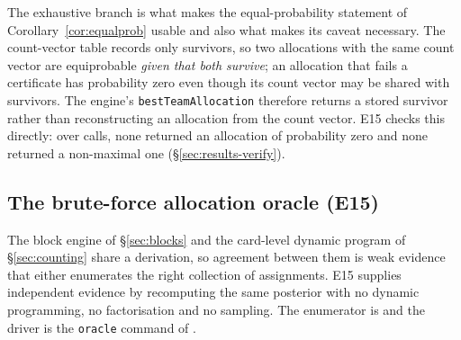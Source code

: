 The exhaustive branch is what makes the equal-probability statement of
Corollary~\ref{cor:equalprob} usable and also what makes its caveat necessary.
The count-vector table records only survivors, so two allocations with the same
count vector are equiprobable \emph{given that both survive}; an allocation that
fails a certificate has probability zero even though its count vector may be
shared with survivors. The engine's \texttt{bestTeamAllocation} therefore returns
a stored survivor rather than reconstructing an allocation from the count vector.
E15 checks this directly: over \numOracleBestChecks{} calls, none returned an
allocation of probability zero and none returned a non-maximal one
(\S\ref{sec:results-verify}).

\subsection{The brute-force allocation oracle (E15)}
\label{app:oracle}

\begin{table}[!htbp]
\centering
\caption{Brute-force oracle (E15) against the exact reference engine.
Population: reachable states from \numOracleGames{} replayed \vfast{} versus
\vthree{} games, seed $20260822$, policy weights frozen; the unit is one state.
\numOracleStates{} states were enumerated, \numOracleStatesCFive{} with a live
ask-legality certificate, over \numOracleDeals{} consistent deals;
\numOracleStatesSkipped{} were skipped as too large. No intervals: every entry is
a deterministic maximum over the checks in the last column, except the sampler
row, a Monte-Carlo frequency comparison.}
\label{tab:oracle}
\small

\end{table}


The block engine of \S\ref{sec:blocks} and the card-level dynamic program of
\S\ref{sec:counting} share a derivation, so agreement between them is weak
evidence that either enumerates the right collection of assignments. E15 supplies
independent evidence by recomputing the same posterior with no dynamic
programming, no factorisation and no sampling. The enumerator is
 and the driver is the \texttt{oracle} command of
.


